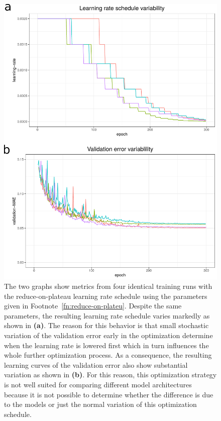 \begin{figure}[H]
	\includegraphics[width=0.9\linewidth]{figures/optimization-variabiliy}
	
	\caption{The two graphs show metrics from four identical training runs with the reduce-on-plateau learning rate schedule using the parameters given in Footnote~\ref{fn:reduce-on-plateu}. Despite the same parameters, the resulting learning rate schedule varies markedly as shown in \textbf{(a)}. The reason for this behavior is that small stochastic variation of the validation error early in the optimization determine when the learning rate is lowered first which in turn influences the whole further optimization process. As a consequence, the resulting learning curves of the validation error also show substantial variation as shown in \textbf{(b)}. For this reason, this optimization strategy is not well suited for comparing different model architectures because it is not possible to determine whether the difference is due to the models or just the normal variation of this optimization schedule.}
	\label{fig:optimization-variablility}
\end{figure}


